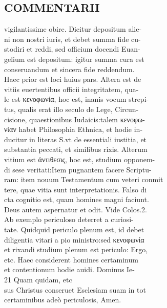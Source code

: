 \documentclass{article}
\begin{document}
\begin{pages}
\section*{COMMENTARII \\
                }vigilantissime obire. Dicitur depositum alie- \\
                ni non nostri iuris, et debet summa fide cu- \\
                stodiri et reddi, sed officium docendi Euan- \\
                gelium est depositum: igitur summa cura est \\
                conseruandum et sincera fide reddendum. \\
                Haec prior est loci huius pars. Altera est de \\
                vitiis euertentibus officii integritatem, qua- \\
                le est κενοφωνία, hoc est, inanis vocum strepi- \\
                tus, qualis erat illo seculo de Lege, Circun- \\
                cisione, quaestionibus Iudaicis:talem κενοφω- \\
                νίαν habet Philosophia Ethnica, et hodie in- \\
                ducitur in literas S.vt de essentiali iustitia, et \\
                substantia peccati, et similibus rixis. Alterum \\
                vitium est ἀντιθεσις, hoc est, studium opponem- \\
                di sese veritati:Item pugnantem facere Scriptu- \\
                ram: item nouum Testamentum cum veteri conmit \\
                tere, quae vitia sunt interpretationis. Falso di \\
                cta cognitio est, quam homines magni faciunt. \\
                Deus autem aspernatur et odit. Vide Colos.2. \\
                Ab exemplo periculoso deterret a curiosi- \\
                tate. Quidquid periculo plenum est, id debet \\
                diligentia vitari a pio ministro:sed κενοφωνία \\
                et rixandi studium plenum est periculo: Ergo, \\
                etc. Haec considerent homines certaminum \\
                et contentionum hodie auidi. Dominus Ie- \\
                21 Quam quidam, etc \\
                sus Christus conseruet Esclesiam suam in tot \\
                certaminibus adeò periculosis, Amen. \\
                
\end{pages}
\end{document}
